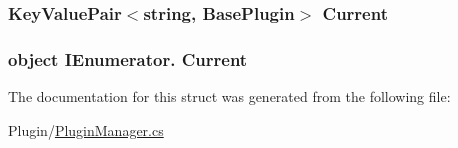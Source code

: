 \subsubsection[{Current}]{\setlength{\rightskip}{0pt plus 5cm}Key\+Value\+Pair$<$string, {\bf Base\+Plugin}$>$ Current\hspace{0.3cm}{\ttfamily [get]}}\label{structOTA_1_1PluginManager_1_1PluginRecordEnumerator_a1765d30fb9b344d2ff4e6efb71f6bbbc}
\hypertarget{structOTA_1_1PluginManager_1_1PluginRecordEnumerator_a8eccab58e57bd9ad7d0acb94bdd3c754}{}
\subsubsection[{Current}]{\setlength{\rightskip}{0pt plus 5cm}object I\+Enumerator. Current\hspace{0.3cm}{\ttfamily [get]}}\label{structOTA_1_1PluginManager_1_1PluginRecordEnumerator_a8eccab58e57bd9ad7d0acb94bdd3c754}


The documentation for this struct was generated from the following file\+:\begin{DoxyCompactItemize}
\item 
Plugin/\hyperlink{PluginManager_8cs}{Plugin\+Manager.\+cs}\end{DoxyCompactItemize}
